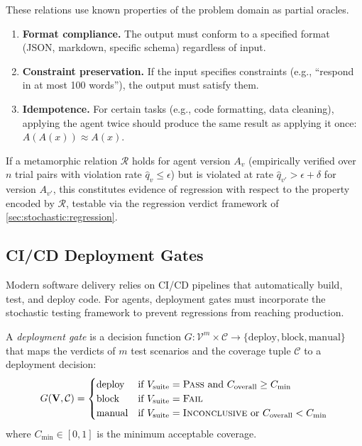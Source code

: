 These relations use known properties of the problem domain as partial
oracles.

\begin{enumerate}[leftmargin=*]
  \item \textbf{Format compliance.} The output must conform to a
    specified format (JSON, markdown, specific schema) regardless of
    input.

  \item \textbf{Constraint preservation.} If the input specifies
    constraints (e.g., ``respond in at most 100 words''), the output
    must satisfy them.

  \item \textbf{Idempotence.} For certain tasks (e.g., code formatting,
    data cleaning), applying the agent twice should produce the same
    result as applying it once: $A(A(x)) \approx A(x)$.
\end{enumerate}

\begin{proposition}
\label{prop:mr-regression}
If a metamorphic relation $\mathcal{R}$ holds for agent version $A_v$
(empirically verified over $n$ trial pairs with violation rate
$\hat{q}_v \leq \epsilon$) but is violated at rate $\hat{q}_{v'} > \epsilon + \delta$
for version $A_{v'}$, this constitutes evidence of regression with respect to
the property encoded by $\mathcal{R}$, testable via the regression verdict
framework of \cref{sec:stochastic:regression}.
\end{proposition}

\subsection{CI/CD Deployment Gates}
\label{sec:cicd}

Modern software delivery relies on CI/CD pipelines that automatically
build, test, and deploy code. For agents, deployment gates must
incorporate the stochastic testing framework to prevent regressions from
reaching production.

\begin{definition}
\label{def:gate}
A \emph{deployment gate} is a decision function
$G: \mathcal{V}^m \times \mathcal{C} \to \{\text{deploy}, \text{block},
\text{manual}\}$ that maps the verdicts of $m$ test scenarios and the
coverage tuple $\mathcal{C}$ to a deployment decision:
\begin{equation}
\label{eq:gate}
  G(\mathbf{V}, \mathcal{C}) =
  \begin{cases}
    \text{deploy} & \text{if } V_{\text{suite}} = \textsc{Pass}
      \text{ and } C_{\text{overall}} \geq C_{\min} \\
    \text{block} & \text{if } V_{\text{suite}} = \textsc{Fail} \\
    \text{manual} & \text{if } V_{\text{suite}} = \textsc{Inconclusive}
      \text{ or } C_{\text{overall}} < C_{\min}
  \end{cases}
\end{equation}
where $C_{\min} \in [0,1]$ is the minimum acceptable coverage.
\end{definition}

